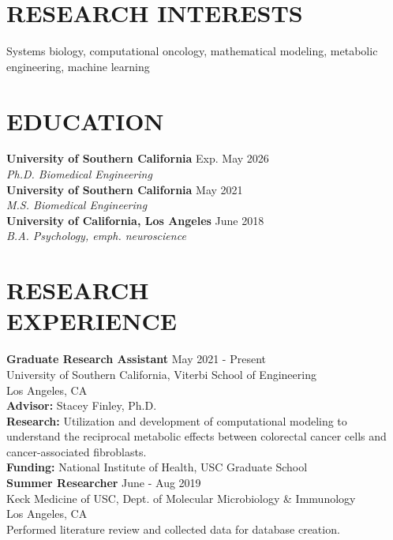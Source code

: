 \documentclass[margin, 10pt]{res} %
\begin{document}
\begin{resume}

\section{RESEARCH INTERESTS}  
Systems biology, computational oncology, mathematical modeling, metabolic engineering, machine learning


\section{EDUCATION}

{\bfseries University of Southern California} \hfill Exp. May 2026 \\
\emph{Ph.D. Biomedical Engineering}\\
{\bfseries University of Southern California} \hfill May 2021 \\
\emph{M.S. Biomedical Engineering}\\
{\bfseries University of California, Los Angeles} \hfill June 2018 \\
\emph{B.A. Psychology, emph. neuroscience}\\


\section{RESEARCH \\ EXPERIENCE} 
{\bf Graduate Research Assistant} \hfill May 2021 - Present  \\ 
University of Southern California, Viterbi School of Engineering \\
Los Angeles, CA\\
\textbf{Advisor:} Stacey Finley, Ph.D. \\
\textbf{Research:} Utilization and development of computational modeling to understand the reciprocal metabolic effects between colorectal cancer cells and cancer-associated fibroblasts. \\
\textbf{Funding:} National Institute of Health, USC Graduate School\\
\newline
{\bf Summer Researcher} \hspace{2.67 cm} \hfill  {June - Aug 2019} \\ 
Keck Medicine of USC, Dept. of Molecular Microbiology \& Immunology \\
Los Angeles, CA \\
Performed literature review and collected data for database creation. 


\end{resume}
\end{document}
